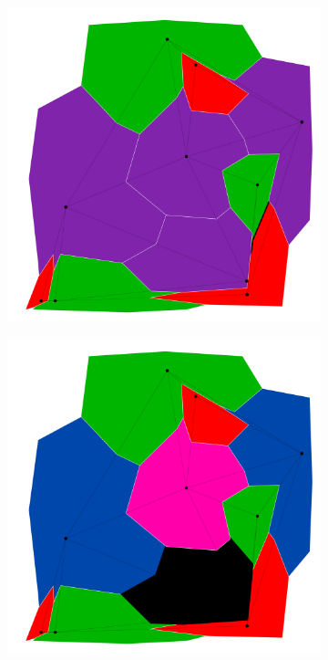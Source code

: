 \documentclass{article}
\begin{document}
\begin{figure}[h!]
			\begin{subfigure}{0.18\textwidth}
				\centering
				\includegraphics[width=\textwidth]{images/sequences/mac_backtracking/bt_mac_I00012}
				\caption{}
				\label{high_c1}
			\end{subfigure}
			\;
			\begin{subfigure}{0.18\textwidth}
				\centering
				\includegraphics[width=\textwidth]{images/sequences/mac_backtracking/bt_mac_I00014}

\end{subfigure}
\end{figure}
\end{document}
